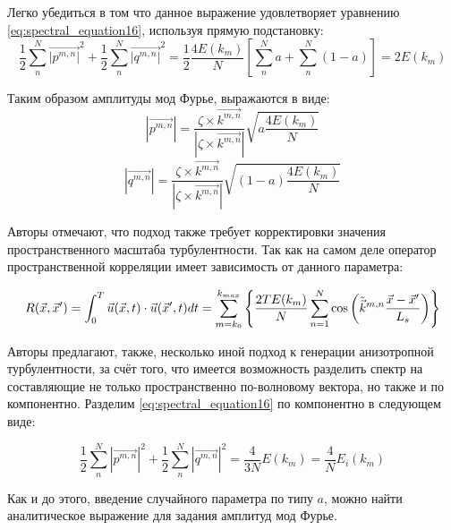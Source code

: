 Легко убедиться в том что данное выражение удовлетворяет уравнению \eqref{eq:spectral_equation16}, используя прямую подстановку:
\begin{equation}
    \frac{1}{2} \sum_{n}^N \vec{|p^{m,n}|}^2 + \frac{1}{2} \sum_{n}^N \vec{|q^{m,n}|}^2 = \frac{1}{2} \frac{4 E(k_m)}{N} \left[ 
    \sum_n^N a + \sum_n^N (1 - a) \right] = 2 E(k_m)
\end{equation}

Таким образом амплитуды мод Фурье, выражаются в виде:
\begin{equation}
    \label{eq:spectral_equation17_1}
    |\vec{p^{m,n}}| = \frac{\zeta \times \vec{k^{m,n}}}{|\zeta \times \vec{k^{m,n}}|} \sqrt{a \frac{4 E(k_m)}{N}}
\end{equation}
\begin{equation}
    \label{eq:spectral_equation17_2}
    |\vec{q^{m,n}}| = \frac{\zeta \times \vec{k^{m,n}}}{|\zeta \times \vec{k^{m,n}}|} \sqrt{(1 - a) \frac{4 E(k_m)}{N}}
\end{equation}

Авторы отмечают, что подход также требует корректировки значения пространственного масштаба турбулентности. Так как на самом деле оператор пространственной корреляции имеет зависимость от данного параметра:

\begin{equation}
    \label{eq:spectral_equation17}
    R(\vec x, \vec x') = \int_0^T \vec{u}(\vec x, t) \cdot \vec{u}(\vec x', t) dt \\
    = \sum_{m=k_0}^{k_{max}} \left\{ \frac{2 T E(k_m)}{N} \sum_{n=1}^N \cos{\left( \Tilde{\vec k}^{m,n} 
    \frac{\vec x - \vec x'}{L_s} \right)} \right\}
\end{equation}

Авторы предлагают, также, несколько иной подход к генерации анизотропной турбулентности, за счёт того, что имеется возможность разделить спектр на составляющие не только пространственно по-волновому вектора, но также и по компонентно. Разделим \eqref{eq:spectral_equation16} по компонентно в следующем виде:

\begin{equation}
    \label{eq:spectral_equation18}
    \frac{1}{2} \sum_{n}^N |\vec{p^{m,n}}|^2 + \frac{1}{2} \sum_{n}^N |\vec{q^{m,n}}|^2 = \frac{4}{3 N} E(k_m) = \frac{4}{N} E_i(k_m) 
\end{equation}

Как и до этого, введение случайного параметра по типу $a$, можно найти аналитическое выражение для задания амплитуд мод Фурье.

